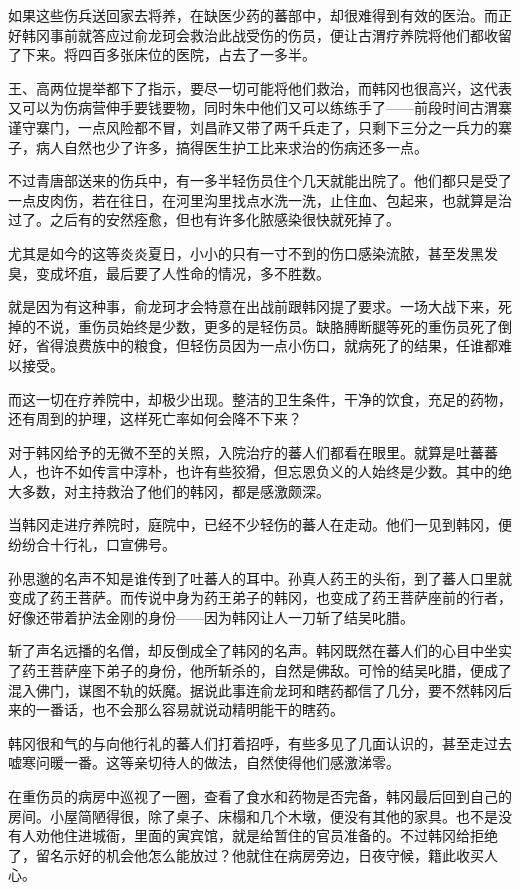 如果这些伤兵送回家去将养，在缺医少药的蕃部中，却很难得到有效的医治。而正好韩冈事前就答应过俞龙珂会救治此战受伤的伤员，便让古渭疗养院将他们都收留了下来。将四百多张床位的医院，占去了一多半。

王、高两位提举都下了指示，要尽一切可能将他们救治，而韩冈也很高兴，这代表又可以为伤病营伸手要钱要物，同时朱中他们又可以练练手了——前段时间古渭寨谨守寨门，一点风险都不冒，刘昌祚又带了两千兵走了，只剩下三分之一兵力的寨子，病人自然也少了许多，搞得医生护工比来求治的伤病还多一点。

不过青唐部送来的伤兵中，有一多半轻伤员住个几天就能出院了。他们都只是受了一点皮肉伤，若在往日，在河里沟里找点水洗一洗，止住血、包起来，也就算是治过了。之后有的安然痊愈，但也有许多化脓感染很快就死掉了。

尤其是如今的这等炎炎夏日，小小的只有一寸不到的伤口感染流脓，甚至发黑发臭，变成坏疽，最后要了人性命的情况，多不胜数。

就是因为有这种事，俞龙珂才会特意在出战前跟韩冈提了要求。一场大战下来，死掉的不说，重伤员始终是少数，更多的是轻伤员。缺胳膊断腿等死的重伤员死了倒好，省得浪费族中的粮食，但轻伤员因为一点小伤口，就病死了的结果，任谁都难以接受。

而这一切在疗养院中，却极少出现。整洁的卫生条件，干净的饮食，充足的药物，还有周到的护理，这样死亡率如何会降不下来？

对于韩冈给予的无微不至的关照，入院治疗的蕃人们都看在眼里。就算是吐蕃蕃人，也许不如传言中淳朴，也许有些狡猾，但忘恩负义的人始终是少数。其中的绝大多数，对主持救治了他们的韩冈，都是感激颇深。

当韩冈走进疗养院时，庭院中，已经不少轻伤的蕃人在走动。他们一见到韩冈，便纷纷合十行礼，口宣佛号。

孙思邈的名声不知是谁传到了吐蕃人的耳中。孙真人药王的头衔，到了蕃人口里就变成了药王菩萨。而传说中身为药王弟子的韩冈，也变成了药王菩萨座前的行者，好像还带着护法金刚的身份——因为韩冈让人一刀斩了结吴叱腊。

斩了声名远播的名僧，却反倒成全了韩冈的名声。韩冈既然在蕃人们的心目中坐实了药王菩萨座下弟子的身份，他所斩杀的，自然是佛敌。可怜的结吴叱腊，便成了混入佛门，谋图不轨的妖魔。据说此事连俞龙珂和瞎药都信了几分，要不然韩冈后来的一番话，也不会那么容易就说动精明能干的瞎药。

韩冈很和气的与向他行礼的蕃人们打着招呼，有些多见了几面认识的，甚至走过去嘘寒问暖一番。这等亲切待人的做法，自然使得他们感激涕零。

在重伤员的病房中巡视了一圈，查看了食水和药物是否完备，韩冈最后回到自己的房间。小屋简陋得很，除了桌子、床榻和几个木墩，便没有其他的家具。也不是没有人劝他住进城衙，里面的寅宾馆，就是给暂住的官员准备的。不过韩冈给拒绝了，留名示好的机会他怎么能放过？他就住在病房旁边，日夜守候，籍此收买人心。

